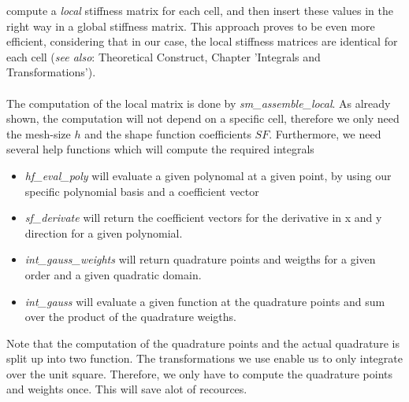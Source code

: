  compute a \textit{local} stiffness matrix for each cell, and then insert these values in the right way in a global stiffness matrix. This approach proves to be even more efficient, considering that in our case, the local stiffness matrices are identical for each cell (\textit{see also}: Theoretical Construct, Chapter 'Integrals and Transformations').\\
\\
The computation of the local matrix is done by \textit{sm\_assemble\_local}. As already shown, the computation will not depend on a specific cell, therefore we only need the mesh-size $h$ and the shape function coefficients $SF$. Furthermore, we need several help functions which will compute the required integrals
\begin{itemize}
\item \textit{hf\_eval\_poly} will evaluate a given polynomal at a given point, by using our specific polynomial basis and a coefficient vector
\item \textit{sf\_derivate} will return the coefficient vectors for the derivative in x and y direction for a given polynomial. 
\item \textit{int\_gauss\_weights} will return quadrature points and weigths for a given order and a given quadratic domain.
\item \textit{int\_gauss} will evaluate a given function at the quadrature points and sum over the product of the quadrature weigths. 
\end{itemize} 
Note that the computation of the quadrature points and the actual quadrature is split up into two function. The transformations we use enable us to only integrate over the unit square. Therefore, we only have to compute the quadrature points and weights once. This will save alot of recources.\\
